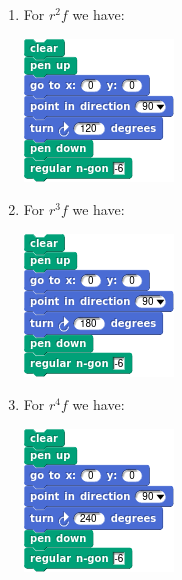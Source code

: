 \documentclass[noauthor,nooutcomes,12pt,hints,handout]{ximera}
\begin{document}
\begin{question}
\begin{freeResponse}
\begin{enumerate}
\begin{center}
      \end{center}
    \item For $r^2f$ we have:
      \begin{center}
        \includegraphics[width=.3\textwidth]{r2fHexSCRIPT.png}   \qquad {}
      \end{center}
    \item For $r^3f$ we have:
      \begin{center}
        \includegraphics[width=.3\textwidth]{r3fHexSCRIPT.png}   \qquad {}
      \end{center}
    \item For $r^4f$ we have:
      \begin{center}
        \includegraphics[width=.3\textwidth]{r4fHexSCRIPT.png}   \qquad {}

\end{center}
\end{enumerate}
\end{freeResponse}
\end{question}
\end{document}

